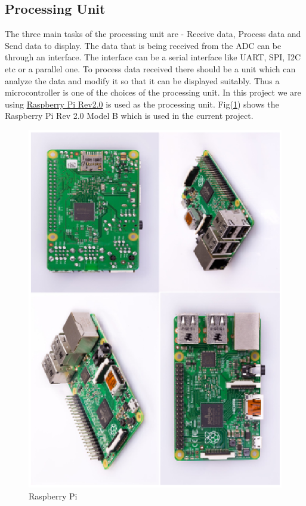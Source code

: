 \documentclass[12pt, a4paper, twoside]{article}
\begin{document}
\subsection{Processing Unit}
    The three main tasks of the processing unit are - Receive data, Process data and Send data to display. The data that is being received from the ADC can be through an interface. The interface can be a serial interface like UART, SPI, I2C etc or a parallel one. To process data received there should be a unit which can analyze the data and modify it so that it can be displayed suitably. Thus a microcontroller is one of the choices of the processing unit. In this project we are using \href{https://www.raspberrypi.org/}{Raspberry Pi Rev2.0}\cite{bib_raspberrypi}  is used as the processing unit. Fig(\ref{fig_rpi}) shows the Raspberry Pi Rev 2.0 Model B which is used in the current project.
 
\begin{figure}[ht]
    \centering
    \includegraphics[scale=0.75]{rpi.ps}
    \caption{Raspberry Pi}
    \label{fig_rpi}
\end{figure}
\end{document}
